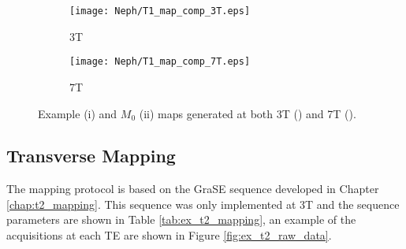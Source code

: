 
\begin{figure}[H]
	\centering
	\begin{subfigure}[c]{0.47\textwidth}
		\centering
		\texttt{[image: Neph/T1\_map\_comp\_3T.eps]}
		\caption{3T}
		\label{fig:ex_t1_map_3t}
	\end{subfigure}
	\hfill
	\begin{subfigure}[c]{0.47\textwidth}
		\centering
		\texttt{[image: Neph/T1\_map\_comp\_7T.eps]}
		\caption{7T}
		\label{fig:ex_t1_map_7t}
	\end{subfigure}
	\caption{Example \tone (i) and $M_0$ (ii) maps generated at both 3T () and 7T ().}
	\label{fig:ex_t1_maps}
\end{figure}

\subsection{Transverse \ttwo Mapping}

The \ttwo mapping protocol is based on the \ac{GraSE} sequence developed in Chapter \ref{chap:t2_mapping}. This sequence was only implemented at 3T and the sequence parameters are shown in Table \ref{tab:ex_t2_mapping}, an example of the acquisitions at each \ac{TE} are shown in Figure \ref{fig:ex_t2_raw_data}. 

